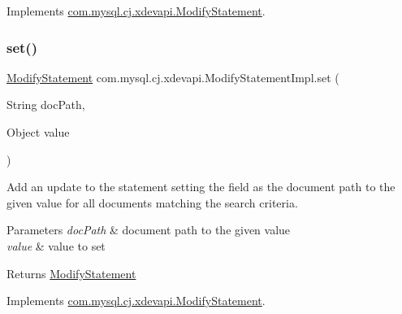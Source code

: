 Implements \mbox{\hyperlink{interfacecom_1_1mysql_1_1cj_1_1xdevapi_1_1_modify_statement_afc2985a9cf8d2624c16428d2be2427b4}{com.\+mysql.\+cj.\+xdevapi.\+Modify\+Statement}}.

\mbox{\label{classcom_1_1mysql_1_1cj_1_1xdevapi_1_1_modify_statement_impl_a4d22ce888e1c809740310f56cba2b6a3}} 
\subsubsection{\texorpdfstring{set()}{set()}}
{\footnotesize\ttfamily \mbox{\hyperlink{interfacecom_1_1mysql_1_1cj_1_1xdevapi_1_1_modify_statement}{Modify\+Statement}} com.\+mysql.\+cj.\+xdevapi.\+Modify\+Statement\+Impl.\+set (\begin{DoxyParamCaption}\item[{String}]{doc\+Path,  }\item[{Object}]{value }\end{DoxyParamCaption})}

Add an update to the statement setting the field as the document path to the given value for all documents matching the search criteria.


\begin{DoxyParams}{Parameters}
{\em doc\+Path} & document path to the given value \\
\hline
{\em value} & value to set \\
\hline
\end{DoxyParams}
\begin{DoxyReturn}{Returns}
\mbox{\hyperlink{interfacecom_1_1mysql_1_1cj_1_1xdevapi_1_1_modify_statement}{Modify\+Statement}} 
\end{DoxyReturn}


Implements \mbox{\hyperlink{interfacecom_1_1mysql_1_1cj_1_1xdevapi_1_1_modify_statement_a224c3d0f2d2218a7d20ecb35ab48bccb}{com.\+mysql.\+cj.\+xdevapi.\+Modify\+Statement}}.

\mbox{\label{classcom_1_1mysql_1_1cj_1_1xdevapi_1_1_modify_statement_impl_ae2479079b83bdbefcabdf68380467a6d}} 
